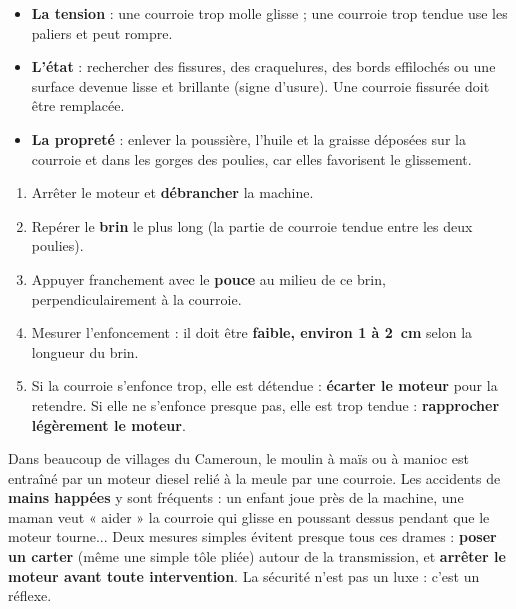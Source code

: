 \documentclass[11pt]{article}
\begin{document}
\begin{itemize}
\item \textbf{La tension} : une courroie trop molle glisse ; une courroie trop tendue use les paliers et peut rompre.
\item \textbf{L'état} : rechercher des fissures, des craquelures, des bords effilochés ou une surface devenue lisse et brillante (signe d'usure). Une courroie fissurée doit être remplacée.
\item \textbf{La propreté} : enlever la poussière, l'huile et la graisse déposées sur la courroie et dans les gorges des poulies, car elles favorisent le glissement.
\end{itemize}

\begin{methode}
\begin{enumerate}
\item Arrêter le moteur et \textbf{débrancher} la machine.
\item Repérer le \textbf{brin} le plus long (la partie de courroie tendue entre les deux poulies).
\item Appuyer franchement avec le \textbf{pouce} au milieu de ce brin, perpendiculairement à la courroie.
\item Mesurer l'enfoncement : il doit être \textbf{faible, environ 1 à \SI{2}{cm}} selon la longueur du brin.
\item Si la courroie s'enfonce trop, elle est détendue : \textbf{écarter le moteur} pour la retendre. Si elle ne s'enfonce presque pas, elle est trop tendue : \textbf{rapprocher légèrement le moteur}.
\end{enumerate}
\end{methode}

\begin{exemplebox}
Dans beaucoup de villages du Cameroun, le moulin à maïs ou à manioc est entraîné par un moteur diesel relié à la meule par une courroie. Les accidents de \textbf{mains happées} y sont fréquents : un enfant joue près de la machine, une maman veut « aider » la courroie qui glisse en poussant dessus pendant que le moteur tourne... Deux mesures simples évitent presque tous ces drames : \textbf{poser un carter} (même une simple tôle pliée) autour de la transmission, et \textbf{arrêter le moteur avant toute intervention}. La sécurité n'est pas un luxe : c'est un réflexe.
\end{exemplebox}
\end{document}
